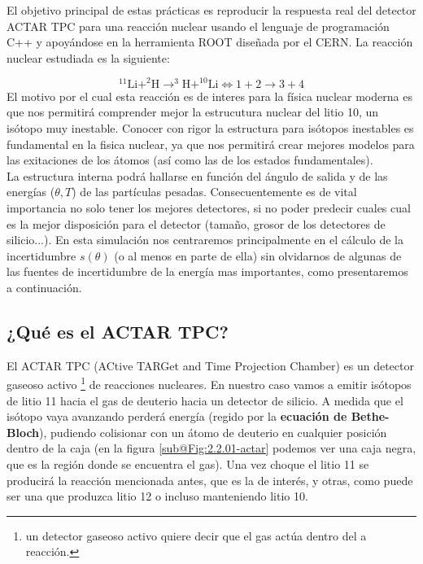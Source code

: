 \documentclass[12pt,a4paper]{article}
\numberwithin{equation}{section}
\numberwithin{figure}{section}
\begin{document}
El objetivo principal de estas prácticas es reproducir la respuesta real del detector ACTAR TPC para una reacción nuclear usando el lenguaje de programación C++ y apoyándose en la herramienta ROOT diseñada por el CERN. La reacción nuclear estudiada es la siguiente:

\begin{equation}
    ^{11}\mathrm{Li}+^2\mathrm{H} \rightarrow ^3\mathrm{H}+^{10}\mathrm{Li} \Longleftrightarrow 1 + 2 \rightarrow 3 + 4
\end{equation}
El motivo por el cual esta reacción es de interes para la física nuclear moderna es que nos permitirá comprender mejor la estrucutura nuclear del litio 10, un isótopo muy inestable. Conocer con rigor la estructura para isótopos inestables es fundamental en la fisica nuclear, ya que nos permitirá crear mejores modelos para las exitaciones de los átomos (así como las de los estados fundamentales).  \\

La estructura interna podrá hallarse en función del ángulo de salida y de las energías ($\theta, T$) de las partículas pesadas. Consecuentemente es de vital importancia no solo tener los mejores detectores, si no poder predecir cuales cual es la mejor disposición para el detector (tamaño, grosor de los detectores de silicio...). En esta simulación nos centraremos principalmente en el cálculo de la incertidumbre $s(\theta)$ (o al menos en parte de ella) sin olvidarnos de algunas de las fuentes de incertidumbre de la energía mas importantes, como presentaremos a continuación. 

\subsection{¿Qué es el ACTAR TPC?}

El ACTAR TPC (ACtive TARGet and Time Projection Chamber) es un detector gaseoso activo \footnote{un detector gaseoso activo quiere decir que el gas actúa dentro del a reacción.} de reacciones nucleares. En nuestro caso vamos a emitir isótopos de litio 11 hacia el gas de deuterio hacia un detector de silicio. A medida que el isótopo vaya avanzando perderá energía (regido por la {\bf ecuación de Bethe-Bloch}), pudiendo colisionar con un átomo de deuterio en cualquier posición dentro de la caja (en la figura \ref{sub@Fig:2.2.01-actar} podemos ver una caja negra, que es la región donde se encuentra el gas). Una vez choque el litio 11 se producirá la reacción mencionada antes, que es la de interés, y otras, como puede ser una que produzca litio 12 o incluso manteniendo litio 10.    \\
\end{document}
